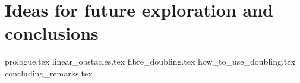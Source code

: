 \documentclass[class=article, crop=false]{standalone}
\begin{document}
\chapter{Ideas for future exploration and conclusions}
\label{chap:ideas_exploration_conclusion}

{prologue.tex}
{linear_obstacles.tex}
{fibre_doubling.tex}
{how_to_use_doubling.tex}
{concluding_remarks.tex}
\end{document}
